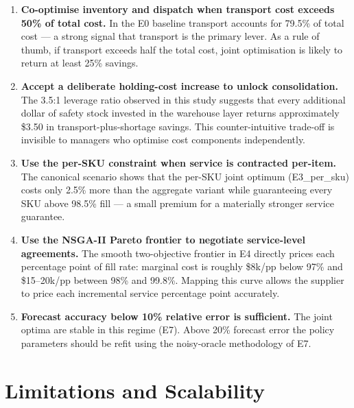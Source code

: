 \begin{enumerate}
  \item \textbf{Co-optimise inventory and dispatch when transport cost
        exceeds 50\% of total cost.}  In the E0 baseline transport
        accounts for 79.5\% of total cost — a strong signal that
        transport is the primary lever.  As a rule of thumb, if
        transport exceeds half the total cost, joint optimisation is
        likely to return at least 25\% savings.

  \item \textbf{Accept a deliberate holding-cost increase to unlock
        consolidation.}  The 3.5:1 leverage ratio observed in this
        study suggests that every additional dollar of safety stock
        invested in the warehouse layer returns approximately \$3.50
        in transport-plus-shortage savings.  This counter-intuitive
        trade-off is invisible to managers who optimise cost
        components independently.

  \item \textbf{Use the per-SKU constraint when service is contracted
        per-item.}  The canonical scenario shows that the per-SKU
        joint optimum (E3\_per\_sku) costs only 2.5\% more than the
        aggregate variant while guaranteeing every SKU above 98.5\%
        fill — a small premium for a materially stronger service
        guarantee.

  \item \textbf{Use the NSGA-II Pareto frontier to negotiate
        service-level agreements.}  The smooth two-objective frontier
        in E4 directly prices each percentage point of fill rate:
        marginal cost is roughly \$8k/pp below 97\% and \$15--20k/pp
        between 98\% and 99.8\%.  Mapping this curve allows the
        supplier to price each incremental service percentage point
        accurately.

  \item \textbf{Forecast accuracy below 10\% relative error is
        sufficient.}  The joint optima are stable in this regime
        (E7).  Above 20\% forecast error the policy parameters should
        be refit using the noisy-oracle methodology of E7.
\end{enumerate}

\section{Limitations and Scalability}
\label{sec:disc:limitations}

